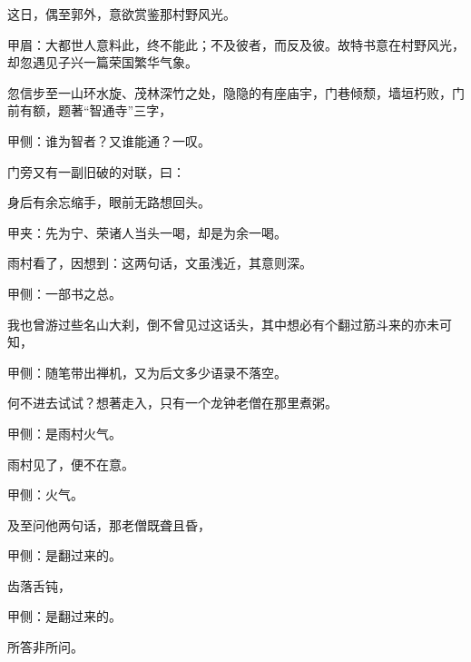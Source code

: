 \begin{parag}
    这日，偶至郭外，意欲赏鉴那村野风光。\begin{note}甲眉：大都世人意料此，终不能此；不及彼者，而反及彼。故特书意在村野风光，却忽遇见子兴一篇荣国繁华气象。\end{note}忽信步至一山环水旋、茂林深竹之处，隐隐的有座庙宇，门巷倾颓，墙垣朽败，门前有额，题著“智通寺”三字，\begin{note}甲侧：谁为智者？又谁能通？一叹。\end{note}门旁又有一副旧破的对联，曰：
\end{parag}


\begin{poem}
    \begin{pl}身后有余忘缩手，眼前无路想回头。\end{pl}\begin{note}甲夹：先为宁、荣诸人当头一喝，却是为余一喝。\end{note}
\end{poem}


\begin{parag}
    雨村看了，因想到：这两句话，文虽浅近，其意则深。\begin{note}甲侧：一部书之总。\end{note}我也曾游过些名山大刹，倒不曾见过这话头，其中想必有个翻过筋斗来的亦未可知，\begin{note}甲侧：随笔带出禅机，又为后文多少语录不落空。\end{note}何不进去试试？想著走入，只有一个龙钟老僧在那里煮粥。\begin{note}甲侧：是雨村火气。\end{note}雨村见了，便不在意。\begin{note}甲侧：火气。\end{note}及至问他两句话，那老僧既聋且昏，\begin{note}甲侧：是翻过来的。\end{note}齿落舌钝，\begin{note}甲侧：是翻过来的。\end{note}所答非所问。
\end{parag}


